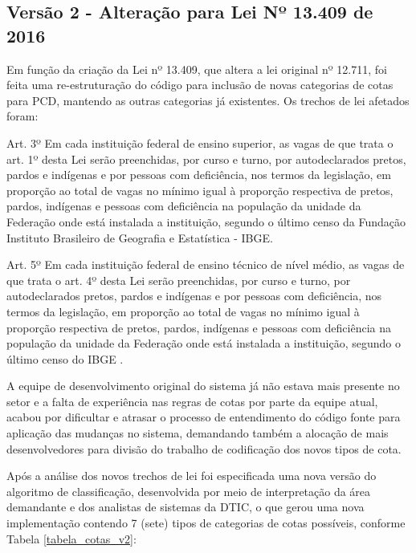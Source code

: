 \subsection{Versão 2 - Alteração para Lei Nº 13.409 de 2016 }
\label{versao2}
 Em função da criação da Lei nº 13.409, que altera a lei original nº 12.711, foi feita uma re-estruturação do código para inclusão de novas categorias de cotas para \gls{PCD}, mantendo as outras categorias já existentes. Os trechos de lei afetados foram:
\begin{citacao}
Art. 3º Em cada instituição federal de ensino superior, as vagas de que trata o art. 1º desta Lei serão preenchidas, por curso e turno, por autodeclarados pretos, pardos e indígenas e por pessoas com deficiência, nos termos da legislação, em proporção ao total de vagas no mínimo igual à proporção respectiva de pretos, pardos, indígenas e pessoas com deficiência na população da unidade da Federação onde está instalada a instituição, segundo o último censo da Fundação Instituto Brasileiro de Geografia e Estatística - IBGE.

Art. 5º Em cada instituição federal de ensino técnico de nível médio, as vagas de que trata o art. 4º desta Lei serão preenchidas, por curso e turno, por autodeclarados pretos, pardos e indígenas e por pessoas com deficiência, nos termos da legislação, em proporção ao total de vagas no mínimo igual à proporção respectiva de pretos, pardos, indígenas e pessoas com deficiência na população da unidade da Federação onde está instalada a instituição, segundo o último censo do IBGE \cite{leicotas2}.
\end{citacao}

A equipe de desenvolvimento original do sistema já não estava mais presente no setor e a falta de experiência nas regras de cotas por parte da equipe atual, acabou por dificultar e atrasar o processo de entendimento do código fonte para aplicação das mudanças no sistema,  demandando também a alocação de mais desenvolvedores para divisão do trabalho de codificação dos novos tipos de cota.

Após a análise dos novos trechos de lei foi especificada uma nova versão do algoritmo de classificação, desenvolvida por meio de interpretação da área demandante e dos analistas de sistemas da \gls{DTIC}, o que gerou uma nova implementação contendo 7 (sete) tipos de categorias de cotas possíveis, conforme Tabela \ref{tabela_cotas_v2}:



